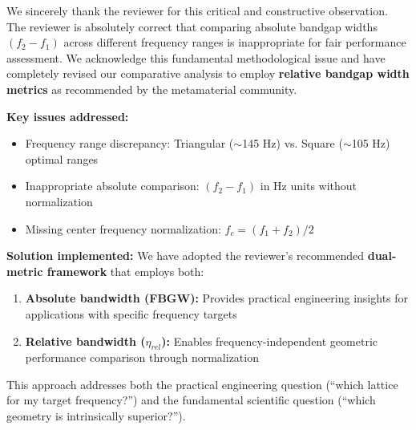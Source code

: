 \documentclass[11pt,a4paper]{article}
\newenvironment{responsebox}{%
    \par\medskip\noindent{\color{responsecolor}\rule{\linewidth}{2pt}}\par
    \noindent{\color{responsecolor}\bfseries Response}\par\smallskip
}{%
    \par\noindent{\color{responsecolor}\rule{\linewidth}{0.5pt}}\medskip
}
\begin{document}
\begin{responsebox}
We sincerely thank the reviewer for this critical and constructive observation. The reviewer is absolutely correct that comparing absolute bandgap widths $(f_2-f_1)$ across different frequency ranges is inappropriate for fair performance assessment. We acknowledge this fundamental methodological issue and have completely revised our comparative analysis to employ \textbf{relative bandgap width metrics} as recommended by the metamaterial community.

\textbf{Key issues addressed:}
\begin{itemize}
    \item Frequency range discrepancy: Triangular ($\sim$145 Hz) vs. Square ($\sim$105 Hz) optimal ranges
    \item Inappropriate absolute comparison: $(f_2-f_1)$ in Hz units without normalization
    \item Missing center frequency normalization: $f_c = (f_1+f_2)/2$
\end{itemize}

\textbf{Solution implemented:} We have adopted the reviewer's recommended \textbf{dual-metric framework} that employs both:
\begin{enumerate}
    \item \textbf{Absolute bandwidth (FBGW):} Provides practical engineering insights for applications with specific frequency targets
    \item \textbf{Relative bandwidth ($\eta_{rel}$):} Enables frequency-independent geometric performance comparison through normalization
\end{enumerate}

This approach addresses both the practical engineering question (``which lattice for my target frequency?'') and the fundamental scientific question (``which geometry is intrinsically superior?'').
\end{responsebox}
\end{document}
